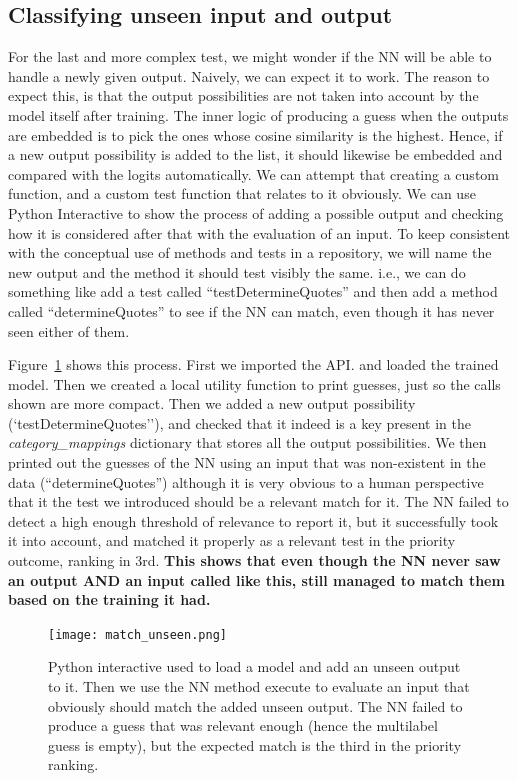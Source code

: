 \documentclass[a4paper, 11pt]{report}
\begin{document}
    \subsection{Classifying unseen input and output}
    For the last and more complex test, we might wonder if the NN will be able to handle a newly given output. Naively, we can expect it to work. The reason to expect this, is that the output possibilities are not taken into account by the model itself after training. The inner logic of producing a guess when the outputs are embedded is to pick the ones whose cosine similarity is the highest. Hence, if a new output possibility is added to the list, it should likewise be embedded and compared with the logits automatically. We can attempt that creating a custom function, and a custom test function that relates to it obviously. We can use Python Interactive to show the process of adding a possible output and checking how it is considered after that with the evaluation of an input. To keep consistent with the conceptual use of methods and tests in a repository, we will name the new output and the method it should test visibly the same. i.e., we can do something like add a test called ``testDetermineQuotes'' and then add a method called ``determineQuotes'' to see if the NN can match, even though it has never seen either of them.

    Figure~\ref{fig: match_unseen} shows this process. First we imported the API. and loaded the trained model. Then we created a local utility function to print guesses, just so the calls shown are more compact. Then we added a new output possibility (`testDetermineQuotes''), and checked that it indeed is a key present in the \textit{category\_mappings} dictionary that stores all the output possibilities. We then printed out the guesses of the NN using an input that was non-existent in the data (``determineQuotes'') although it is very obvious to a human perspective that it the test we introduced should be a relevant match for it. The NN failed to detect a high enough threshold of relevance to report it, but it successfully took it into account, and matched it properly as a relevant test in the priority outcome, ranking in 3rd. \textbf{This shows that even though the NN never saw an output AND an input called like this, still managed to match them based on the training it had.}

    \begin{figure}[ht!]
        \centering
        \texttt{[image: match\_unseen.png]}
        \caption[Matching an unseen input to an unseen output]{Python interactive used to load a model and add an unseen output to it. Then we use the NN method execute to evaluate an input that obviously should match the added unseen output. The NN failed to produce a guess that was relevant enough (hence the multilabel guess is empty), but the expected match is the third in the priority ranking.}
        \label{fig: match_unseen}
    \end{figure}
\end{document}

